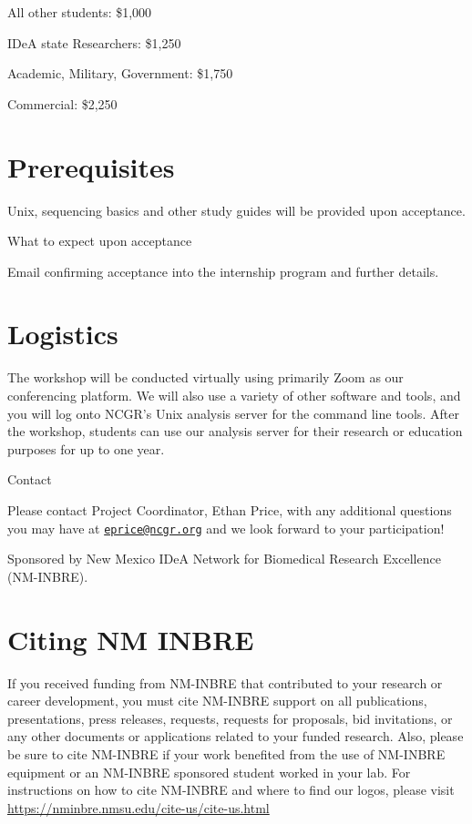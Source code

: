 \documentclass[
]{book}
\begin{document}
All other students:
\$1,000

IDeA state Researchers:
\$1,250

Academic, Military, Government:
\$1,750

Commercial:
\$2,250

\hypertarget{prerequisites-3}{%
\section*{Prerequisites}\label{prerequisites-3}}

Unix, sequencing basics and other study guides will be provided upon acceptance.

What to expect upon acceptance

Email confirming acceptance into the internship program and further details.

\hypertarget{logistics-3}{%
\section*{Logistics}\label{logistics-3}}

The workshop will be conducted virtually using primarily Zoom as our conferencing platform. We will also use a variety of other software and tools, and you will log onto NCGR's Unix analysis server for the command line tools. After the workshop, students can use our analysis server for their research or education purposes for up to one year.

Contact

Please contact Project Coordinator, Ethan Price, with any additional questions you may have at \href{mailto:eprice@ncgr.org}{\nolinkurl{eprice@ncgr.org}} and we look forward to your participation!

Sponsored by New Mexico IDeA Network for Biomedical Research Excellence (NM-INBRE).

\hypertarget{citing-nm-inbre}{%
\section*{Citing NM INBRE}\label{citing-nm-inbre}}

If you received funding from NM-INBRE that contributed to your research or career development, you must cite NM-INBRE support on all publications, presentations, press releases, requests, requests for proposals, bid invitations, or any other documents or applications related to your funded research. Also, please be sure to cite NM-INBRE if your work benefited from the use of NM-INBRE equipment or an NM-INBRE sponsored student worked in your lab.
For instructions on how to cite NM-INBRE and where to find our logos, please visit \url{https://nminbre.nmsu.edu/cite-us/cite-us.html}
\end{document}
